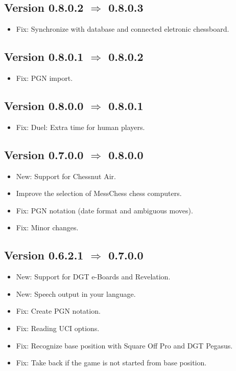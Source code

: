 \documentclass[11pt,a4paper]{article}
\begin{document}
\subsection*{Version 0.8.0.2 $\Rightarrow$  0.8.0.3}
\begin{itemize}
	\item Fix: Synchronize with database and connected eletronic chessboard.
\end{itemize}

\subsection*{Version 0.8.0.1 $\Rightarrow$  0.8.0.2}
\begin{itemize}
	\item Fix: PGN import.
\end{itemize}

\subsection*{Version 0.8.0.0 $\Rightarrow$  0.8.0.1}
\begin{itemize}
	\item Fix: Duel: Extra time for human players.
\end{itemize}

\subsection*{Version 0.7.0.0 $\Rightarrow$  0.8.0.0}
\begin{itemize}
	\item New: Support for Chessnut Air.
	\item Improve the selection of MessChess chess computers.
	\item Fix: PGN notation (date format and ambiguous moves).
	\item Fix: Minor changes.
\end{itemize}

\subsection*{Version 0.6.2.1 $\Rightarrow$  0.7.0.0}
\begin{itemize}
	\item New: Support for DGT e-Boards and Revelation.
	\item New: Speech output in your language.
	\item Fix: Create PGN notation.
    \item Fix: Reading UCI options.
	\item Fix: Recognize base position with Square Off Pro and DGT Pegasus.
	\item Fix: Take back if the game is not started from base position.
\end{itemize}
\end{document}
